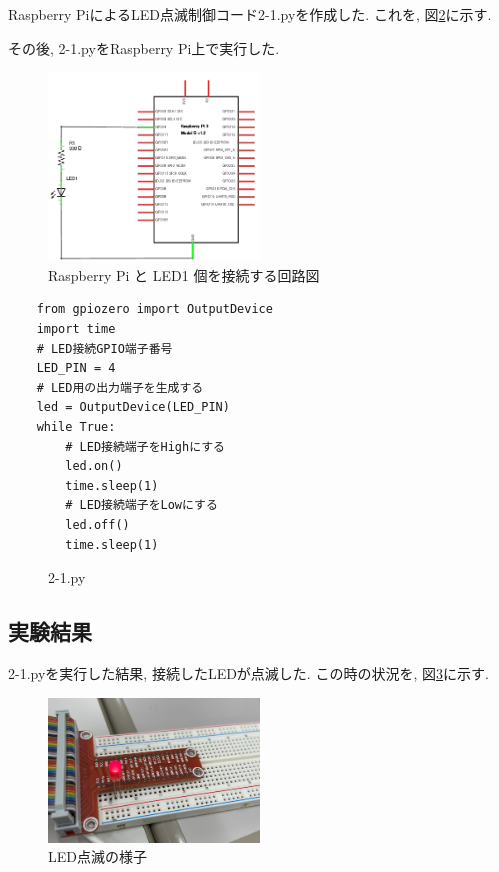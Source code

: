 \documentclass{ltjsarticle} %
\begin{document}
Raspberry PiによるLED点滅制御コード2-1.pyを作成した. これを, 図\ref{fig:2-1py}に示す.

その後, 2-1.pyをRaspberry Pi上で実行した.  

\begin{figure}[H] %
  \centering
  \includegraphics[width=0.5\textwidth]{fig2-1.png} %
  \caption{Raspberry Pi と LED1 個を接続する回路図} %
  \label{fig:fig2-1} %
\end{figure}

\begin{mdframed}
  \begin{verbatim}
    from gpiozero import OutputDevice
    import time
    # LED接続GPIO端⼦番号  
    LED_PIN = 4
    # LED⽤の出⼒端⼦を⽣成する
    led = OutputDevice(LED_PIN)
    while True:
        # LED接続端⼦をHighにする
        led.on()
        time.sleep(1)
        # LED接続端⼦をLowにする
        led.off()
        time.sleep(1)	
  \end{verbatim}
  \end{mdframed}
  \begin{figure}[H]
  \caption{2-1.py}
  \label{fig:2-1py}
  \end{figure}


\subsection{実験結果}

2-1.pyを実行した結果, 接続したLEDが点滅した.
この時の状況を, 図\ref{fig:raspi2-1}に示す.

\begin{figure}[H] %
  \centering
  \includegraphics[width=0.5\textwidth]{raspi2-1.JPEG} %
  \caption{LED点滅の様子} %
  \label{fig:raspi2-1} %
\end{figure}
\end{document}
